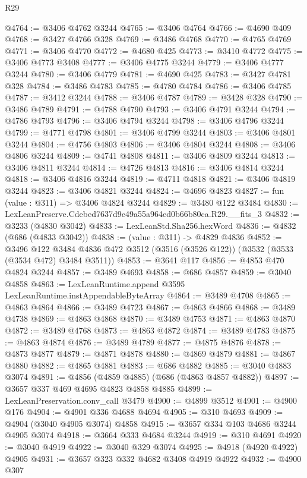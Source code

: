 \begin{lexlean}{R29}
\begin{coremodule}
@4764 := @3406 @4762 @3244
@4765 := @3406 @4764
@4766 := @4690 @409
@4768 := @3427 @4766 @328
@4769 := @3486 @4768
@4770 := @4765 @4769
@4771 := @3406 @4770
@4772 := @4680 @425
@4773 := @3410 @4772
@4775 := @3406 @4773 @3408
@4777 := @3406 @4775 @3244
@4779 := @3406 @4777 @3244
@4780 := @3406 @4779
@4781 := @4690 @425
@4783 := @3427 @4781 @328
@4784 := @3486 @4783
@4785 := @4780 @4784
@4786 := @3406 @4785
@4787 := @3412 @3244
@4788 := @3406 @4787
@4789 := @3428 @328
@4790 := @3486 @4789
@4791 := @4788 @4790
@4793 := @3406 @4791 @3244
@4794 := @4786 @4793
@4796 := @3406 @4794 @3244
@4798 := @3406 @4796 @3244
@4799 := @4771 @4798
@4801 := @3406 @4799 @3244
@4803 := @3406 @4801 @3244
@4804 := @4756 @4803
@4806 := @3406 @4804 @3244
@4808 := @3406 @4806 @3244
@4809 := @4741 @4808
@4811 := @3406 @4809 @3244
@4813 := @3406 @4811 @3244
@4814 := @4726 @4813
@4816 := @3406 @4814 @3244
@4818 := @3406 @4816 @3244
@4819 := @4711 @4818
@4821 := @3406 @4819 @3244
@4823 := @3406 @4821 @3244
@4824 := @4696 @4823
@4827 := fun (value : @311) => @3406 @4824 @3244
@4829 := @3480 @122 @3484
@4830 := LexLeanPreserve.Cdebed7637d9c49a55a964ed0b66b80ca.R29.__fits_3
@4832 := @3233 (@4830 @3042)
@4833 := LexLeanStd.Sha256.hexWord
@4836 := @4832 (@686 (@4833 @3042))
@4838 := (value : @311) -> @4829 @4836
@4852 := @3496
    @122
    @3484
    @4836
    @472
    @3512
    (@3516 (@3526 @122))
    (@3532 (@3533 (@3534 @472) @3484 @3511))
@4853 := @3641 @117
@4856 := @4853 @470 @4824 @3244
@4857 := @3489 @4693
@4858 := @686 @4857
@4859 := @3040 @4858
@4863 := LexLeanRuntime.append @3595 LexLeanRuntime.instAppendableByteArray
@4864 := @3489 @4708
@4865 := @4863 @4864
@4866 := @3489 @4723
@4867 := @4863 @4866
@4868 := @3489 @4738
@4869 := @4863 @4868
@4870 := @3489 @4753
@4871 := @4863 @4870
@4872 := @3489 @4768
@4873 := @4863 @4872
@4874 := @3489 @4783
@4875 := @4863 @4874
@4876 := @3489 @4789
@4877 := @4875 @4876
@4878 := @4873 @4877
@4879 := @4871 @4878
@4880 := @4869 @4879
@4881 := @4867 @4880
@4882 := @4865 @4881
@4883 := @686 @4882
@4885 := @3040 @4883 @3074
@4891 := @4856 (@4859 @4885) (@686 (@4863 @4857 @4882))
@4897 := @3657 @337 @469 @4695 @4823 @4858 @4885
@4899 := LexLeanPreservation.conv_call @3479
@4900 := @4899 @3512
@4901 := @4900 @176
@4904 := @4901 @336 @4688 @4694
@4905 := @310 @4693
@4909 := @4904 (@3040 @4905 @3074) @4858
@4915 := @3657 @334 @103 @4686 @3244 @4905 @3074
@4918 := @3664 @333 @4684 @3244
@4919 := @310 @4691
@4920 := @3040 @4919
@4922 := @3040 @329 @3074
@4925 := @4918 (@4920 @4922) @4905
@4931 := @3657 @323 @332 @4682 @3408 @4919 @4922
@4932 := @4900 @307

\end{coremodule}
\end{lexlean}
